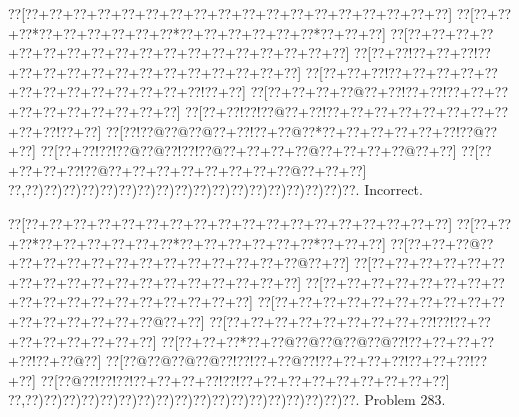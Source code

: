 \documentclass[a5paper]{article}
\begin{document}
\begin{center}
{\goo
\0??[\0??+\0??+\0??+\0??+\0??+\0??+\0??+\0??+\0??+\0??+\0??+\0??+\0??+\0??+\0??+\0??+\0??+\0??]
\0??[\0??+\0??+\0??*\0??+\0??+\0??+\0??+\0??+\0??*\0??+\0??+\0??+\0??+\0??+\0??*\0??+\0??+\0??]
\0??[\0??+\0??+\0??+\0??+\0??+\0??+\0??+\0??+\0??+\0??+\0??+\0??+\0??+\0??+\0??+\0??+\0??+\0??]
\0??[\0??+\0??!\0??+\0??+\0??!\0??+\0??+\0??+\0??+\0??+\0??+\0??+\0??+\0??+\0??+\0??+\0??+\0??]
\0??[\0??+\0??+\0??!\0??+\0??+\0??+\0??+\0??+\0??+\0??+\0??+\0??+\0??+\0??+\0??+\0??!\0??+\0??]
\0??[\0??+\0??+\0??+\0??@\0??+\0??!\0??+\0??!\0??+\0??+\0??+\0??+\0??+\0??+\0??+\0??+\0??+\0??]
\0??[\0??+\0??!\0??!\0??@\0??+\0??!\0??+\0??+\0??+\0??+\0??+\0??+\0??+\0??+\0??+\0??!\0??+\0??]
\0??[\0??!\0??@\0??@\0??@\0??+\0??!\0??+\0??@\0??*\0??+\0??+\0??+\0??+\0??+\0??!\0??@\0??+\0??]
\0??[\0??+\0??!\0??!\0??@\0??@\0??!\0??!\0??@\0??+\0??+\0??+\0??@\0??+\0??+\0??+\0??@\0??+\0??]
\0??[\0??+\0??+\0??+\0??!\0??@\0??+\0??+\0??+\0??+\0??+\0??+\0??+\0??@\0??+\0??+\0??]
\0??,\0??)\0??)\0??)\0??)\0??)\0??)\0??)\0??)\0??)\0??)\0??)\0??)\0??)\0??)\0??)\0??)\0??)\0??.
}
Incorrect. 

\end{center}
\newpage
\begin{center}
{\goo
\0??[\0??+\0??+\0??+\0??+\0??+\0??+\0??+\0??+\0??+\0??+\0??+\0??+\0??+\0??+\0??+\0??+\0??+\0??]
\0??[\0??+\0??+\0??*\0??+\0??+\0??+\0??+\0??+\0??*\0??+\0??+\0??+\0??+\0??+\0??*\0??+\0??+\0??]
\0??[\0??+\0??+\0??@\0??+\0??+\0??+\0??+\0??+\0??+\0??+\0??+\0??+\0??+\0??+\0??+\0??@\0??+\0??]
\0??[\0??+\0??+\0??+\0??+\0??+\0??+\0??+\0??+\0??+\0??+\0??+\0??+\0??+\0??+\0??+\0??+\0??+\0??]
\0??[\0??+\0??+\0??+\0??+\0??+\0??+\0??+\0??+\0??+\0??+\0??+\0??+\0??+\0??+\0??+\0??+\0??+\0??]
\0??[\0??+\0??+\0??+\0??+\0??+\0??+\0??+\0??+\0??+\0??+\0??+\0??+\0??+\0??+\0??+\0??@\0??+\0??]
\0??[\0??+\0??+\0??+\0??+\0??+\0??+\0??+\0??+\0??!\0??!\0??+\0??+\0??+\0??+\0??+\0??+\0??+\0??]
\0??[\0??+\0??+\0??*\0??+\0??@\0??@\0??@\0??@\0??@\0??!\0??+\0??+\0??+\0??+\0??!\0??+\0??@\0??]
\0??[\0??@\0??@\0??@\0??@\0??!\0??!\0??+\0??@\0??!\0??+\0??+\0??+\0??!\0??+\0??+\0??!\0??+\0??]
\0??[\0??@\0??!\0??!\0??!\0??+\0??+\0??+\0??!\0??!\0??+\0??+\0??+\0??+\0??+\0??+\0??+\0??+\0??]
\0??,\0??)\0??)\0??)\0??)\0??)\0??)\0??)\0??)\0??)\0??)\0??)\0??)\0??)\0??)\0??)\0??)\0??)\0??.
}
Problem 283.

\end{center}
\end{document}
